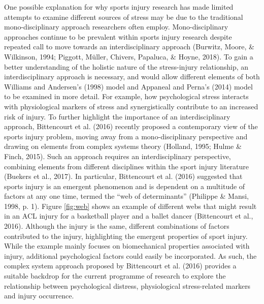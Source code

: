 \documentclass[
  english,
  man,floatsintext]{apa6}
\begin{document}
One possible explanation for why sports injury research has made limited attempts to examine different sources of stress may be due to the traditional mono-disciplinary approach researchers often employ.
Mono-disciplinary approaches continue to be prevalent within sports injury research despite repeated call to move towards an interdisciplinary approach (Burwitz, Moore, \& Wilkinson, 1994; Piggott, Müller, Chivers, Papaluca, \& Hoyne, 2018).
To gain a better understanding of the holistic nature of the stress-injury relationship, an interdisciplinary approach is necessary, and would allow different elements of both Williams and Andersen's (1998) model and Appaneal and Perna's (2014) model to be examined in more detail.
For example, how psychological stress interacts with physiological markers of stress and synergistically contribute to an increased risk of injury.
To further highlight the importance of an interdisciplinary approach, Bittencourt et al. (2016) recently proposed a contemporary view of the sports injury problem, moving away from a mono-disciplinary perspective and drawing on elements from complex systems theory (Holland, 1995; Hulme \& Finch, 2015).
Such an approach requires an interdisciplinary perspective, combining elements from different disciplines within the sport injury literature (Buekers et al., 2017).
In particular, Bittencourt et al. (2016) suggested that sports injury is an emergent phenomenon and is dependent on a multitude of factors at any one time, termed the \enquote{web of determinants} (Philippe \& Mansi, 1998, p. 1).
Figure \ref{fig:web} shows an example of different webs that might result in an ACL injury for a basketball player and a ballet dancer (Bittencourt et al., 2016).
Although the injury is the same, different combinations of factors contributed to the injury, highlighting the emergent properties of sport injury.
While the example mainly focuses on biomechanical properties associated with injury, additional psychological factors could easily be incorporated.
As such, the complex system approach proposed by Bittencourt et al. (2016) provides a suitable backdrop for the current programme of research to explore the relationship between psychological distress, physiological stress-related markers and injury occurrence.
\end{document}
